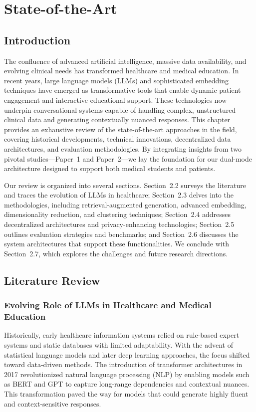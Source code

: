 \chapter{State-of-the-Art}

\section{Introduction}
The confluence of advanced artificial intelligence, massive data availability, and evolving clinical needs has transformed healthcare and medical education. In recent years, large language models (LLMs) and sophisticated embedding techniques have emerged as transformative tools that enable dynamic patient engagement and interactive educational support. These technologies now underpin conversational systems capable of handling complex, unstructured clinical data and generating contextually nuanced responses. This chapter provides an exhaustive review of the state-of-the-art approaches in the field, covering historical developments, technical innovations, decentralized data architectures, and evaluation methodologies. By integrating insights from two pivotal studies—Paper~1 and Paper~2—we lay the foundation for our dual-mode architecture designed to support both medical students and patients.

Our review is organized into several sections. Section~2.2 surveys the literature and traces the evolution of LLMs in healthcare; Section~2.3 delves into the methodologies, including retrieval-augmented generation, advanced embedding, dimensionality reduction, and clustering techniques; Section~2.4 addresses decentralized architectures and privacy-enhancing technologies; Section~2.5 outlines evaluation strategies and benchmarks; and Section~2.6 discusses the system architectures that support these functionalities. We conclude with Section~2.7, which explores the challenges and future research directions.

\section{Literature Review}

\subsection{Evolving Role of LLMs in Healthcare and Medical Education}
Historically, early healthcare information systems relied on rule-based expert systems and static databases with limited adaptability. With the advent of statistical language models and later deep learning approaches, the focus shifted toward data-driven methods. The introduction of transformer architectures in 2017 revolutionized natural language processing (NLP) by enabling models such as BERT and GPT to capture long-range dependencies and contextual nuances. This transformation paved the way for models that could generate highly fluent and context-sensitive responses.

